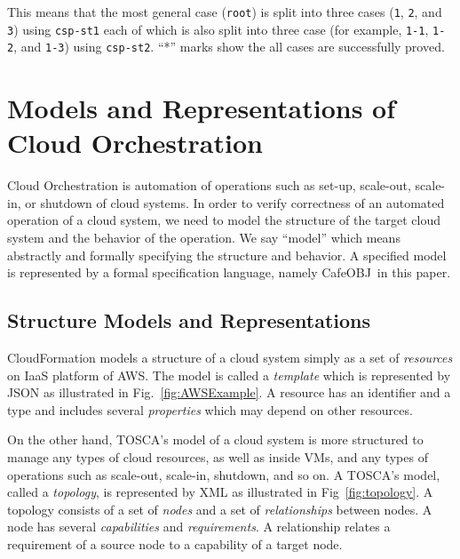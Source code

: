 \documentclass[12pt]{report}
\newcommand{\cafeobj}{{\sf CafeOBJ}~}
\begin{document}
\normalsize
This means that the most general case ({\tt root}) is split into three
cases ({\tt 1}, {\tt 2}, and {\tt 3}) using {\tt csp-st1} each of
which is also split into three case (for example, {\tt 1-1},
{\tt 1-2}, and {\tt 1-3}) using {\tt csp-st2}.  ``*'' marks show the
all cases are successfully proved.

\chapter{Models and Representations of Cloud Orchestration}
\label{chap:model}
Cloud Orchestration is automation of operations such as set-up,
scale-out, scale-in, or shutdown of cloud systems. In order to verify
correctness of an automated operation of a cloud system, we need to
model the structure of the target cloud system and the behavior of the
operation. We say ``model'' which means abstractly and formally
specifying the structure and behavior. A specified model is represented
by a formal specification language, namely \cafeobj in this paper.

\section{Structure Models and Representations}
\label{sec:structuremodel}
CloudFormation models a structure of a cloud system simply as a set
of {\it resources} on IaaS platform of AWS. The model is called a {\it
  template} which is represented by JSON as illustrated in
Fig.~\ref{fig:AWSExample}.  A resource has an identifier and a type
and includes several {\it properties} which may depend on other
resources.

On the other hand, TOSCA's model of a cloud system is more structured
to manage any types of cloud resources, as well as inside VMs, and any
types of operations such as scale-out, scale-in, shutdown, and so on.
A TOSCA's model, called a {\it topology}, is represented by XML
as illustrated in Fig~\ref{fig:topology}. A topology consists of a set
of {\it nodes} and a set of {\it relationships} between nodes. A node
has several {\it capabilities} and {\it requirements}. A relationship
relates a requirement of a source node to a capability of a target
node.
\end{document}
